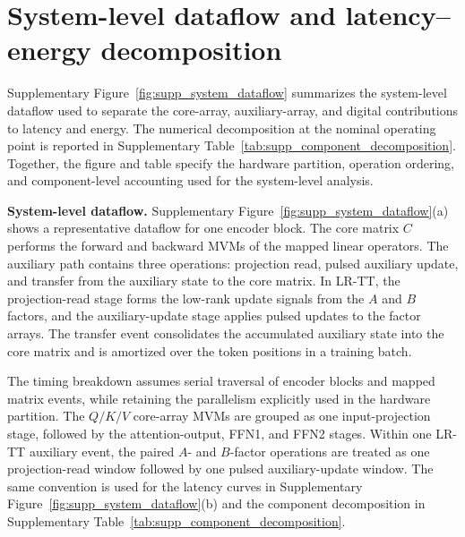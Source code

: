 \documentclass[AMA,LATO1COL]{WileyNJDv5}
\newcommand{\SIEndSection}{\FloatBarrier\clearpage}
\begin{document}
\SIEndSection

\section{System-level dataflow and latency--energy decomposition}
\label{sec:supp_system_decomposition}

\noindent
Supplementary Figure~\ref{fig:supp_system_dataflow} summarizes the system-level dataflow used to separate the core-array, auxiliary-array, and digital contributions to latency and energy. The numerical decomposition at the nominal operating point is reported in Supplementary Table~\ref{tab:supp_component_decomposition}. Together, the figure and table specify the hardware partition, operation ordering, and component-level accounting used for the system-level analysis.

\noindent\textbf{System-level dataflow.}
Supplementary Figure~\ref{fig:supp_system_dataflow}(a) shows a representative dataflow for one encoder block. The core matrix \(C\) performs the forward and backward MVMs of the mapped linear operators. The auxiliary path contains three operations: projection read, pulsed auxiliary update, and transfer from the auxiliary state to the core matrix. In LR-TT, the projection-read stage forms the low-rank update signals from the \(A\) and \(B\) factors, and the auxiliary-update stage applies pulsed updates to the factor arrays. The transfer event consolidates the accumulated auxiliary state into the core matrix and is amortized over the token positions in a training batch.

\noindent
The timing breakdown assumes serial traversal of encoder blocks and mapped matrix events, while retaining the parallelism explicitly used in the hardware partition. The \(Q/K/V\) core-array MVMs are grouped as one input-projection stage, followed by the attention-output, FFN1, and FFN2 stages. Within one LR-TT auxiliary event, the paired \(A\)- and \(B\)-factor operations are treated as one projection-read window followed by one pulsed auxiliary-update window. The same convention is used for the latency curves in Supplementary Figure~\ref{fig:supp_system_dataflow}(b) and the component decomposition in Supplementary Table~\ref{tab:supp_component_decomposition}.
\end{document}
